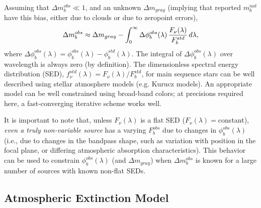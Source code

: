 \documentclass[12pt,preprint]{aastex}
\begin{document}
Assuming that $\Delta m_b^{obs} \ll 1$, and an unknown $\Delta m_{gray}$ (implying that reported
$m_b^{nat}$ have this bias, either due to clouds or due to zeropoint errors), 
\begin{equation}
  \Delta m_b^{obs}   \approx \Delta m_{gray} - \int_0^\infty { \Delta\phi_b^{obs}(\lambda) \,  {F_\nu(\lambda) \over F_b^{std}} \, d\lambda},
\end{equation}
where $\Delta\phi_b^{obs}(\lambda) = \phi_b^{obs}(\lambda) - \phi_b^{std}(\lambda)$. The integral of 
$\Delta\phi_b^{obs}(\lambda)$ over wavelength is always zero (by definition).  The dimensionless 
spectral energy distribution (SED), $f_\nu^{std}(\lambda) = F_\nu(\lambda) /F_b^{std}$, for main sequence
stars can be well described using stellar atmosphere models (e.g. Kurucz models). An appropriate
model can be well constrained using broad-band colors; at precisions required here, a fast-converging
iterative scheme works well. 

It is important to note that, unless $F_\nu(\lambda)$ is a flat SED ($F_\nu(\lambda)=$constant), {\it even a truly non-variable source}
has a varying $F_b^{obs}$ due to changes in $\phi_b^{obs}(\lambda)$ (i.e., due to changes in the bandpass 
shape, such as variation with position in the focal plane, or differing atmospheric absorption characteristics).
This behavior can be used to constrain
$\phi_b^{obs}(\lambda)$ (and $\Delta m_{gray}$) when $\Delta m_b^{obs}$ is known for a large number of 
sources with known non-flat SEDs. 



\subsection{Atmospheric Extinction Model} 
\end{document}
